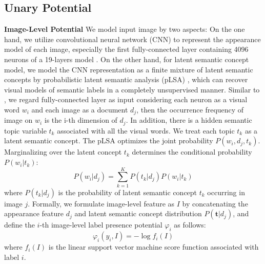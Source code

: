 \subsection{Unary Potential}
\textbf{Image-Level Potential}
We model input image by two aspects: On the one hand, we utilize convolutional neural network (CNN) to represent the appearance model of each image, especially the first fully-connected layer containing 4096 neurons of a 19-layers model \cite{simonyan2014very}.
On the other hand, for latent semantic concept model, we model the CNN representation as a finite mixture of latent semantic concepts by probabilistic latent semantic analysis (pLSA) \cite{sivic2005discovering}, which can recover visual models of semantic labels in a completely unsupervised manner.
Similar to \cite{wang2014weakly}, we regard fully-connected layer as input considering each neuron as a visual word $w_i$ and each image as a document $d_j$, then the occurrence frequency of image on $w_i$ is the i-th dimension of $d_j$.
In addition, there is a hidden semantic topic variable $t_k$ associated with all the visual words.
We treat each topic $t_k$ as a latent semantic concept. The pLSA optimizes the joint probability $P(w_i,d_j,t_k)$.
Marginalizing over the latent concept $t_k$ determines the conditional probability $P(w_i|t_k)$:
\begin{equation}
  P(w_i|d_j) = \sum_{k=1}^K{P(t_k|d_j)P(w_i|t_k)}
\end{equation}
where $P(t_k|d_j)$ is the probability of latent semantic concept $t_k$ occurring in image $j$.
Formally, we formulate image-level feature as $I$ by concatenating the appearance feature $d_j$ and latent semantic concept distribution $P(\boldsymbol{t}|d_j)$, and define the $i$-th image-level label presence potential $\varphi_{i}$ as follows:
\begin{equation}
    \varphi_{i}(y_i,I) = -\log f_{i}(I)
    \label{eq:global}
\end{equation}
where $f_{i}(I)$ is the linear support vector machine    score function associated with label $i$.

